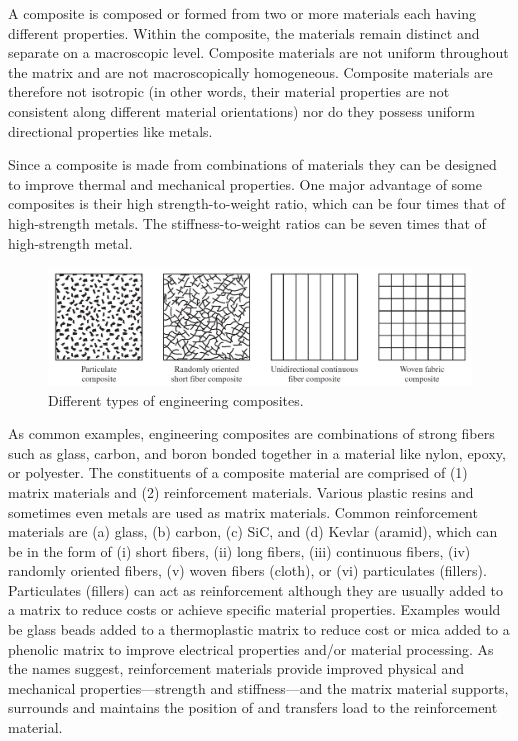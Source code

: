 \documentclass[
10pt,
a4paper,
openany,
svgnames,
]{book}
\begin{document}
A composite is composed or formed from two or more materials each having different properties. Within the composite, the materials remain distinct and separate on a macroscopic level. Composite materials are not uniform throughout the matrix and are not macroscopically homogeneous. Composite materials are therefore not isotropic (in other words, their material properties are not consistent along different material orientations) nor do they possess uniform directional properties like metals.

Since a composite is made from combinations of materials they can be designed to improve thermal and mechanical properties. One major advantage of some composites is their high strength-to-weight ratio, which can be four times that of high-strength metals. The stiffness-to-weight ratios can be seven times that of high-strength metal.

\begin{figure}[h]
  \centering
  \includegraphics[width=\textwidth]{pictures/Material-selection/composites}
  \begin{tikzpicture}
  \end{tikzpicture}
  \caption{Different types of engineering composites. \cite{shigley2011shigley}}
\end{figure}

As common examples, engineering composites are combinations of strong fibers such as glass, carbon, and boron bonded together in a material like nylon, epoxy, or polyester. The constituents of a composite material are comprised of (1) matrix materials and (2) reinforcement materials. Various plastic resins and sometimes even metals are used as matrix materials. Common reinforcement materials are (a) glass, (b) carbon, (c) SiC, and (d) Kevlar (aramid), which can be in the form of (i) short fibers, (ii) long fibers, (iii) continuous fibers, (iv) randomly oriented fibers, (v) woven fibers (cloth), or (vi) particulates (fillers). Particulates (fillers) can act as reinforcement although they are usually added to a matrix to reduce costs or achieve specific material properties. Examples would be glass beads added to a thermoplastic matrix to reduce cost or mica added to a phenolic matrix to improve electrical properties and/or material processing. As the names suggest, reinforcement materials provide improved physical and mechanical properties—strength and stiffness—and the matrix material supports, surrounds and maintains the position of and transfers load to the reinforcement material.
\end{document}
